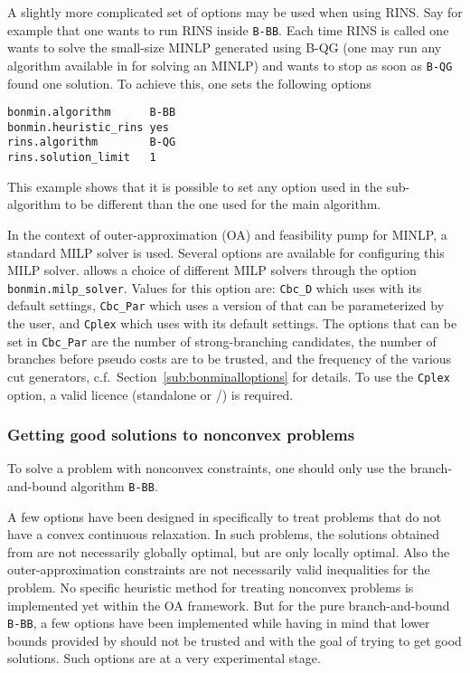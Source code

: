 A slightly more complicated set of options may be used when using RINS.
Say for example that one wants to run RINS inside \texttt{B-BB}.
Each time RINS is called one wants to solve the small-size MINLP generated using B-QG (one may run any algorithm available in \BONMIN for solving an MINLP) and wants to stop as soon as \texttt{B-QG} found one solution.
To achieve this, one sets the following options
\begin{verbatim}
bonmin.algorithm      B-BB
bonmin.heuristic_rins yes
rins.algorithm        B-QG
rins.solution_limit   1
\end{verbatim}
This example shows that it is possible to set any option used in the sub-algorithm to be different than the one used for the main algorithm.

In the context of outer-approximation (OA) and feasibility pump for MINLP, a standard MILP solver is used.
Several options are available for configuring this MILP solver.
\BONMIN allows a choice of different MILP solvers through the option
\texttt{bonmin.milp\_sol\-ver}. Values for this option are: {\tt Cbc\_D} which uses \CBC with its
default settings, {\tt Cbc\_Par} which uses a version of \CBC that can be parameterized by the user, and \texttt{Cplex} which uses \CPLEX with its default settings.
The options that can be set in {\tt Cbc\_Par} are the number of strong-branching candidates,
the number of branches before pseudo costs are to be trusted, and the frequency of the various cut generators, c.f.\ Section~\ref{sub:bonminalloptions} for details.
To use the \texttt{Cplex} option, a valid \CPLEX licence (standalone or \GAMS/\CPLEX) is required.

\subsubsection{Getting good solutions to nonconvex problems}
To solve a problem with nonconvex constraints, one should only use the branch-and-bound algorithm {\tt B-BB}.

A few options have been designed in \BONMIN specifically to treat
problems that do not have a convex continuous relaxation.
In such problems, the solutions obtained from \IPOPT are
not necessarily globally optimal, but are only locally optimal.
Also the outer-approximation constraints are not necessarily valid inequalities for the problem.
No specific heuristic method for treating nonconvex problems is implemented
yet within the OA framework.
But for the pure branch-and-bound {\tt B-BB}, a few options have been implemented while having
in mind that lower bounds provided by \IPOPT should not be trusted and with the goal of
trying to get good solutions. Such options are at a very experimental stage.

